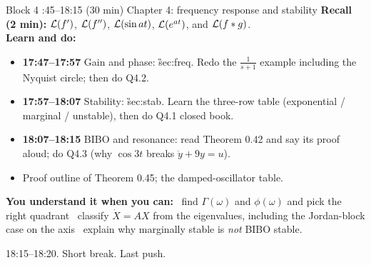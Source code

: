 \begin{sessionbox}{Block 4 :45--18:15 (30 min) \quad Chapter 4: frequency response and stability}
\textbf{Recall (2 min):} $\mathcal{L}(f')$, $\mathcal{L}(f'')$, $\mathcal{L}(\sin at)$, $\mathcal{L}(e^{at})$, and $\mathcal{L}(f*g)$.\\
\textbf{Learn and do:}
\begin{itemize}
\item[\core] \textbf{17:47--17:57} Gain and phase: \G{sec:freq}. Redo the $\frac1{s+1}$ example including the Nyquist circle; then do Q4.2.
\item[\core] \textbf{17:57--18:07} Stability: \G{sec:stab}. Learn the three-row table (exponential / marginal / unstable), then do Q4.1 closed book.
\item[\core] \textbf{18:07--18:15} BIBO and resonance: read Theorem 0.42 and say its proof aloud; do Q4.3 (why $\cos3t$ breaks $\ddot y+9y=u$).
\item[\extra] Proof outline of Theorem 0.45; the damped-oscillator table.
\end{itemize}
\textbf{You understand it when you can:}
\tick\ find $\Gamma(\omega)$ and $\phi(\omega)$ and pick the right quadrant \quad
\tick\ classify $\dot X=AX$ from the eigenvalues, including the Jordan-block case on the axis \quad
\tick\ explain why marginally stable is \emph{not} BIBO stable.
\end{sessionbox}

\begin{breakbox}18:15--18:20. Short break. Last push.\end{breakbox}

